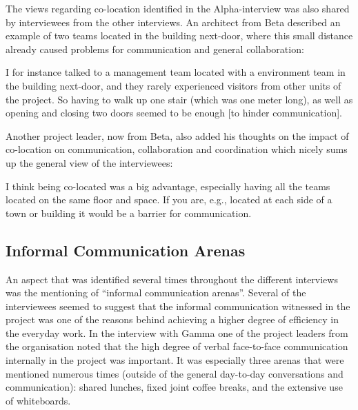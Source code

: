 The views regarding co-location identified in the Alpha-interview was also shared by interviewees from the other interviews. An architect from Beta described an example of two teams located in the building next-door, where this small distance already caused problems for communication and general collaboration:

\begin{fancyquotes}
I for instance talked to a management team located with a environment team in the building next-door, and they rarely experienced visitors from other units of the project. So having to walk up one stair (which was one meter long), as well as opening and closing two doors seemed to be enough [to hinder communication].
\end{fancyquotes}

Another project leader, now from Beta, also added his thoughts on the impact of co-location on communication, collaboration and coordination which nicely sums up the general view of the interviewees:

\begin{fancyquotes}
I think being co-located was a big advantage, especially having all the teams located on the same floor and space. If you are, e.g., located at each side of a town or building it would be a barrier for communication.
\end{fancyquotes}


\subsection{Informal Communication Arenas}

An aspect that was identified several times throughout the different interviews was the mentioning of ``informal communication arenas''. Several of the interviewees seemed to suggest that the informal communication witnessed in the project was one of the reasons behind achieving a higher degree of efficiency in the everyday work. In the interview with Gamma one of the project leaders from the organisation noted that the high degree of verbal face-to-face communication internally in the project was important. It was especially three arenas that were mentioned numerous times (outside of the general day-to-day conversations and communication): shared lunches, fixed joint coffee breaks, and the extensive use of whiteboards.


